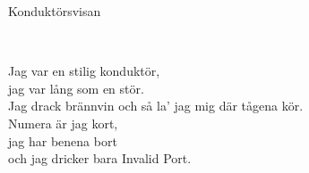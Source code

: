 \begin{song}{Konduktörsvisan}
	
	
	\\
	
	Jag var en stilig konduktör,\\
	jag var lång som en stör.\\
	Jag drack brännvin och så la' jag mig där tågena kör.\\
	Numera är jag kort,\\
	jag har benena bort\\
	och jag dricker bara Invalid Port.
	
\end{song}
